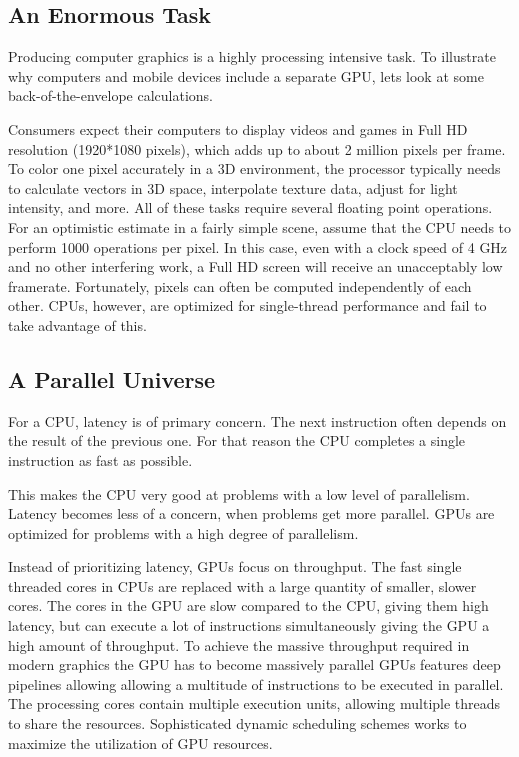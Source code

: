 \documentclass[../main/report.tex]{subfiles}
\begin{document}
\subsection{An Enormous Task}

Producing computer graphics is a highly processing intensive task.
To illustrate why computers and mobile devices include a separate GPU, lets look at some back-of-the-envelope calculations.

Consumers expect their computers to display videos and games in Full HD resolution (1920*1080 pixels), which adds up to about 2 million pixels per frame.
To color one pixel accurately in a 3D environment, the processor typically needs to calculate vectors in 3D space, interpolate texture data, adjust for light intensity, and more.
All of these tasks require several floating point operations.
For an optimistic estimate in a fairly simple scene, assume that the CPU needs to perform 1000 operations per pixel. 
In this case, even with a clock speed of 4 GHz and no other interfering work, a Full HD screen will receive an unacceptably low framerate.
Fortunately, pixels can often be computed independently of each other.
CPUs, however, are optimized for single-thread performance and fail to take advantage of this.

\subsection{A Parallel Universe}

For a CPU, latency is of primary concern.
The next instruction often depends on the result of the previous one.
For that reason the CPU completes a single instruction as fast as possible.

This makes the CPU very good at problems with a low level of parallelism.
Latency becomes less of a concern, when problems get more parallel.
GPUs are optimized for problems with a high degree of parallelism.

Instead of prioritizing latency, GPUs focus on throughput.
The fast single threaded cores in CPUs are replaced with a large quantity of smaller, slower cores.
The cores in the GPU are slow compared to the CPU, giving them high latency, but can execute a lot of instructions simultaneously giving the GPU a high amount of throughput.
To achieve the massive throughput required in modern graphics the GPU has to become massively parallel 
GPUs features deep pipelines allowing allowing a multitude of instructions to be executed in parallel.
The processing cores contain multiple execution units, allowing multiple threads to share the resources.
Sophisticated dynamic scheduling schemes works to maximize the utilization of GPU resources.
\end{document}
